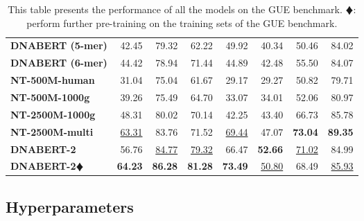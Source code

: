 \documentclass{article}
\begin{document}
\begin{table}[H]
\begin{tabular}{lrrrrrrr}
            {\textbf{DNABERT (5-mer)} } & 42.45 & 79.32 & 62.22 & 49.92 & 40.34&  50.46 & 84.02\\

            {\textbf{DNABERT (6-mer) } } &  44.42 & 78.94 & 71.44 & 44.89 & 42.48 &55.50 & 84.07 \\

            {\textbf{NT-500M-human} } &  31.04 & 75.04 & 61.67 & 29.17 & 29.27 &  50.82 & 79.71 \\

            {\textbf{NT-500M-1000g} } & 39.26 & 75.49 & 64.70 & 33.07 & 34.01 &  52.06 & 80.97 \\

            {\textbf{NT-2500M-1000g} } & 48.31 & 80.02 & 70.14 & 42.25 & 43.40 &  66.73 & 85.78  \\

            {\textbf{NT-2500M-multi} } & \underline{63.31} & 83.76 & 71.52 & \underline{69.44} & 47.07 &  \textbf{73.04} & \textbf{89.35} \\

		
		\midrule

            {\textbf{DNABERT-2} } & 56.76 & \underline{84.77} & \underline{79.32} & 66.47 & \textbf{52.66} & \underline{71.02} & 84.99 \\

            {\textbf{DNABERT-2$\vardiamondsuit$} } &  \textbf{64.23} & \textbf{86.28} & \textbf{81.28} & \textbf{73.49} & \underline{50.80} & 68.49 & \underline{85.93}\\
		\bottomrule
	\end{tabular}
 
	\caption{
		This table presents the performance of all the models on the GUE benchmark.  $\vardiamondsuit$: perform further pre-training on the training sets of the GUE benchmark.
	}\label{tb:all_results}
\end{table}








		


 

\subsection{Hyperparameters}
\label{subsec:hyperparameters}
\end{document}

